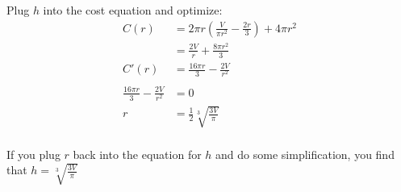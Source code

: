 \documentclass[fleqn]{exam}
\begin{document}
\begin{itemize*}
\begin{solution}
Plug $h$ into the cost equation and optimize:
\begin{align*}
  C(r) &= 2 \pi r \left( \frac{V}{\pi r^2} - \frac{2r}{3} \right)  + 4 \pi r^2 \\
       &= \frac{2V}{r} + \frac{8 \pi r^2}{3} \\
  C'(r) &= \frac{16 \pi r}{3} - \frac{2 V}{r^2} \\
\\
  \frac{16 \pi r}{3} - \frac{2 V}{r^2} &= 0 \\
   r &= \frac{1}{2} \sqrt[3]{\frac{3V}{\pi}} \\
\end{align*}

If you plug $r$ back into the equation for $h$ and do some simplification, you find that $h = \sqrt[3]{\frac{3V}{\pi}}$

\end{solution}

\end{itemize*}

\ifprintanswers
\pagebreak
\fi
\end{document}
